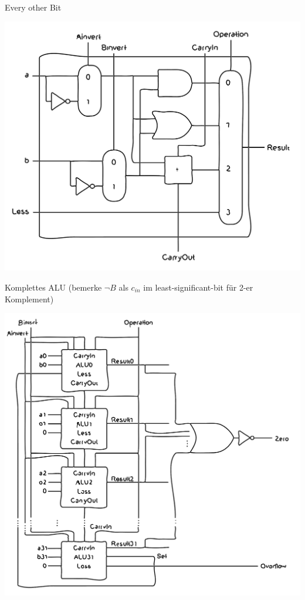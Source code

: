\documentclass[a4paper,6pt]{article}
\begin{document}
\begin{multicols*}{3}
Every other Bit
\begin{center}
    \includegraphics[width=1\linewidth]{resources/EO_Bit.png}
\end{center}

Komplettes ALU (bemerke $\neg B$ als $c_{in}$ im least-significant-bit für 2-er Komplement)
\begin{center}    
    \includegraphics[width=1\linewidth]{resources/ALU_komplet.png}
\end{center}


\end{multicols*}
\end{document}
